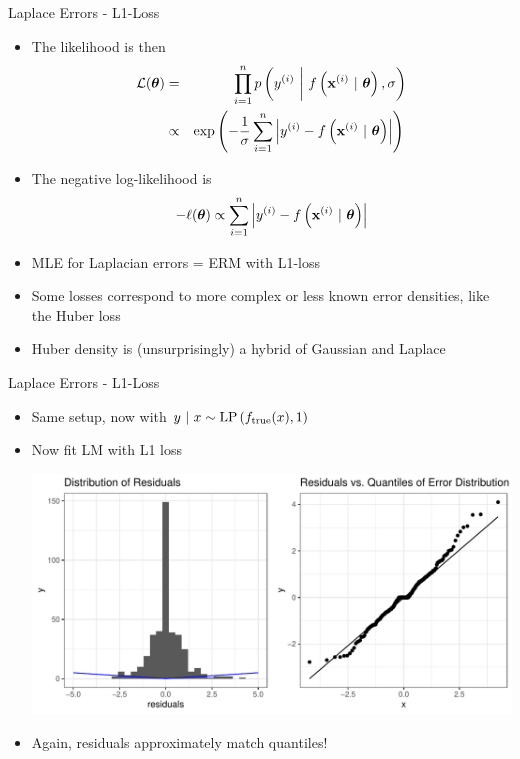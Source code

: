 \documentclass[11pt,compress,t,notes=noshow, xcolor=table]{beamer}
\begin{document}
\begin{vbframe}{Laplace Errors - L1-Loss}

\begin{itemize}
    \item The likelihood is then 
\begin{eqnarray*}
\mathcal{L}(\bm{\theta}) &=& \prod_{i=1}^n p\left(y^{(i)} ~\bigg|~ f\left(\mathbf{x}^{(i)} ~|~ \bm{\theta}\right), \sigma\right) \\ &\propto& \exp\left(-\frac{1}{\sigma}\sum\limits_{i=1}^n \left|y^{(i)} - f\left(\mathbf{x}^{(i)} ~|~ \bm{\theta}\right)\right|\right)\,
\end{eqnarray*}
\item The negative log-likelihood is
$$
- \ell(\bm{\theta}) \propto \sum\limits_{i=1}^n \left|y^{(i)} - f\left(\mathbf{x}^{(i)} ~|~ \bm{\theta}\right)\right|
$$

\item MLE for Laplacian errors = ERM with L1-loss 

\item Some losses correspond to more complex or less known error densities, like the Huber loss 

\item Huber density is (unsurprisingly) a hybrid of Gaussian and Laplace

\end{itemize}

\end{vbframe}
\begin{vbframe}{Laplace Errors - L1-Loss}

\begin{itemize}
	\item Same setup, now with $y ~|~x \sim \text{LP}\left(f_{\text{true}}(x), 1\right)$ 
\item Now fit LM with L1 loss

\vfill

\includegraphics{figure/residuals_plot_L1.pdf}


\item Again, residuals approximately match quantiles!


\end{itemize}


\end{vbframe}
\end{document}
